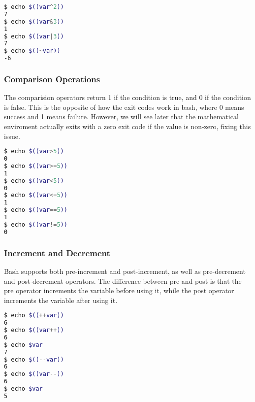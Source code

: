 \begin{lstlisting}[language=bash]
$ echo $((var^2))
7
$ echo $((var&3))
1
$ echo $((var|3))
7
$ echo $((~var))
-6
\end{lstlisting}

\subsubsection{Comparison Operations}

The comparision operators return 1 if the condition is true, and 0 if the condition is false.
This is the opposite of how the exit codes work in bash, where 0 means success and 1 means failure. However, we will see later that the mathematical enviroment actually exits with a zero exit code if the value is non-zero, fixing this issue.

\begin{lstlisting}[language=bash]
$ echo $((var>5))
0
$ echo $((var>=5))
1
$ echo $((var<5))
0
$ echo $((var<=5))
1
$ echo $((var==5))
1
$ echo $((var!=5))
0
\end{lstlisting}

\subsubsection{Increment and Decrement}

Bash supports both pre-increment and post-increment, as well as pre-decrement and post-decrement operators.
The difference between pre and post is that the pre operator increments the variable before using it, while the post operator increments the variable after using it.

\begin{lstlisting}[language=bash]
$ echo $((++var))
6
$ echo $((var++))
6
$ echo $var
7
$ echo $((--var))
6
$ echo $((var--))
6
$ echo $var
5
\end{lstlisting}

